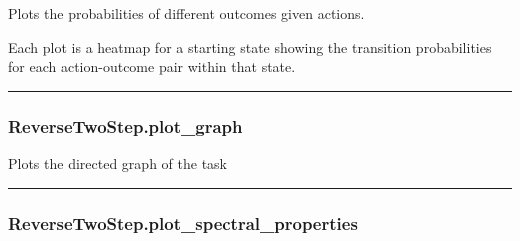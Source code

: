 \begin{Shaded}
\begin{Highlighting}[]
\OperatorTok{=}\OperatorTok{=}\OperatorTok{=}\OperatorTok{=}\NormalTok{)}
\end{Highlighting}
\end{Shaded}

Plots the probabilities of different outcomes given actions.

Each plot is a heatmap for a starting state showing the transition
probabilities for each action-outcome pair within that state.

\begin{center}\rule{0.5\linewidth}{\linethickness}\end{center}

\hypertarget{reversetwostep.plot_graph}{%
\subsubsection{ReverseTwoStep.plot\_graph}\label{reversetwostep.plot_graph}}

\begin{Shaded}
\begin{Highlighting}[]
\OperatorTok{=}\OperatorTok{=}\OperatorTok{=}\OperatorTok{=}\OperatorTok{=}\OperatorTok{=}\OperatorTok{=}\OperatorTok{=}\NormalTok{)}
\end{Highlighting}
\end{Shaded}

Plots the directed graph of the task

\begin{center}\rule{0.5\linewidth}{\linethickness}\end{center}

\hypertarget{reversetwostep.plot_spectral_properties}{%
\subsubsection{ReverseTwoStep.plot\_spectral\_properties}\label{reversetwostep.plot_spectral_properties}}

